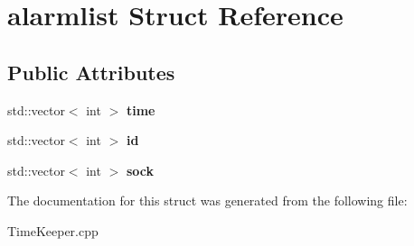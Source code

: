 \hypertarget{structalarmlist}{\section{alarmlist Struct Reference}
\label{structalarmlist}
}
\subsection*{Public Attributes}
\begin{DoxyCompactItemize}
\item 
\hypertarget{structalarmlist_a3e114b23a6a6ae05a3f5c1e962028f45}{std\-::vector$<$ int $>$ {\bfseries time}}\label{structalarmlist_a3e114b23a6a6ae05a3f5c1e962028f45}

\item 
\hypertarget{structalarmlist_a7e0736b739d53bd3b8d073d4e994f147}{std\-::vector$<$ int $>$ {\bfseries id}}\label{structalarmlist_a7e0736b739d53bd3b8d073d4e994f147}

\item 
\hypertarget{structalarmlist_a7ba093f7b8d90ae0dce874678061799f}{std\-::vector$<$ int $>$ {\bfseries sock}}\label{structalarmlist_a7ba093f7b8d90ae0dce874678061799f}

\end{DoxyCompactItemize}


The documentation for this struct was generated from the following file\-:\begin{DoxyCompactItemize}
\item 
Time\-Keeper.\-cpp\end{DoxyCompactItemize}
